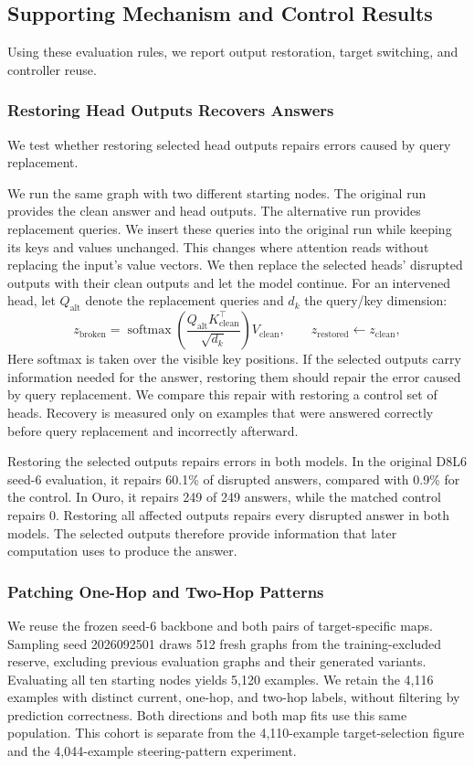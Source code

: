 \documentclass{article}
\begin{document}
\subsection{Supporting Mechanism and Control Results}
\label{app:graph-results}
Using these evaluation rules, we report output restoration, target switching, and controller reuse.

\subsubsection{Restoring Head Outputs Recovers Answers}
\label{sec:restore}
We test whether restoring selected head outputs repairs errors caused by query replacement.

We run the same graph with two different starting nodes. The original run provides the clean answer and head outputs. The alternative run provides replacement queries. We insert these queries into the original run while keeping its keys and values unchanged. This changes where attention reads without replacing the input's value vectors. We then replace the selected heads' disrupted outputs with their clean outputs and let the model continue. For an intervened head, let $Q_{\mathrm{alt}}$ denote the replacement queries and $d_k$ the query/key dimension:
\begin{equation}
 z_{\mathrm{broken}}
 =\operatorname{softmax}\!\left(\frac{Q_{\mathrm{alt}}K_{\mathrm{clean}}^\top}{\sqrt{d_k}}\right)V_{\mathrm{clean}},
 \qquad
 z_{\mathrm{restored}}\leftarrow z_{\mathrm{clean}},
\end{equation}
Here softmax is taken over the visible key positions. If the selected outputs carry information needed for the answer, restoring them should repair the error caused by query replacement. We compare this repair with restoring a control set of heads. Recovery is measured only on examples that were answered correctly before query replacement and incorrectly afterward.

Restoring the selected outputs repairs errors in both models. In the original D8L6 seed-6 evaluation, it repairs 60.1\% of disrupted answers, compared with 0.9\% for the control. In Ouro, it repairs 249 of 249 answers, while the matched control repairs 0. Restoring all affected outputs repairs every disrupted answer in both models. The selected outputs therefore provide information that later computation uses to produce the answer.

\subsubsection{Patching One-Hop and Two-Hop Patterns}
\label{app:target-exchange}
We reuse the frozen seed-6 backbone and both pairs of target-specific maps. Sampling seed 2026092501 draws 512 fresh graphs from the training-excluded reserve, excluding previous evaluation graphs and their generated variants. Evaluating all ten starting nodes yields 5,120 examples. We retain the 4,116 examples with distinct current, one-hop, and two-hop labels, without filtering by prediction correctness. Both directions and both map fits use this same population. This cohort is separate from the 4,110-example target-selection figure and the 4,044-example steering-pattern experiment.
\end{document}
